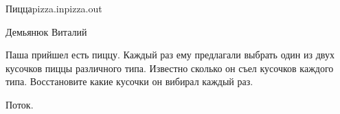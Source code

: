 \begin{proposal}{Пицца}{pizza.in}{pizza.out}{}

\Author                  
Демьянюк Виталий

\ProblemIdea
Паша прийшел есть пиццу. Каждый раз ему предлагали выбрать один из двух кусочков пиццы различного типа. Известно сколько он съел кусочков каждого типа. Восстановите какие кусочки он вибирал каждый раз.

\ProblemVariations

\SolutionIdea
Поток.
\end{proposal}
